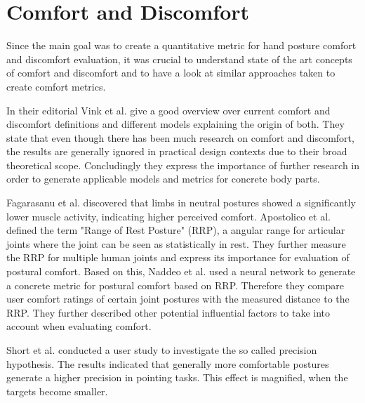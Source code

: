 \section{Comfort and Discomfort}

Since the main goal was to create a quantitative metric for hand posture comfort and discomfort evaluation, it was crucial to understand state of the art concepts of comfort and discomfort and to have a look at similar approaches taken to create comfort metrics.

In their editorial Vink et al. \cite{vink2012editorial} give a good overview over current comfort and discomfort definitions and different models explaining the origin of both. They state that even though there has been much research on comfort and discomfort, the results are generally ignored in practical design contexts due to their broad theoretical scope. Concludingly they express the importance of further research in order to generate applicable models and metrics for concrete body parts.

Fagarasanu et al. \cite{fagarasanu2004measurement} discovered that limbs in neutral postures showed a significantly lower muscle activity, indicating higher perceived comfort. Apostolico et al. \cite{apostolico2014postural} defined the term "Range of Rest Posture" (RRP), a angular range for articular joints where the joint can be seen as statistically in rest. They further measure the RRP for multiple human joints and express its importance for evaluation of postural comfort. Based on this, Naddeo et al. \cite{naddeo2015proposal} used a neural network to generate a concrete metric for postural comfort based on RRP. Therefore they compare user comfort ratings of certain joint postures with the measured distance to the RRP. They further described other potential influential factors to take into account when evaluating comfort.

Short et al. \cite{short1999precision} conducted a user study to investigate the so called precision hypothesis. The results indicated that generally more comfortable postures generate a higher precision in pointing tasks. This effect is magnified, when the targets become smaller.